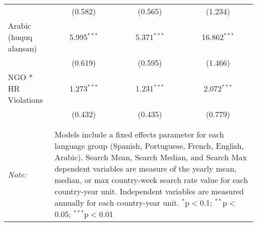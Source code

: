 \begin{table}[!htbp]
\begin{tabular}{@{\extracolsep{5pt}}lccc}
  & (0.582) & (0.565) & (1.234) \\ 
  Arabic (huquq alansan) & 5.995$^{***}$ & 5.371$^{***}$ & 16.862$^{***}$ \\ 
  & (0.619) & (0.595) & (1.466) \\ 
  NGO * HR Violations & 1.273$^{***}$ & 1.231$^{***}$ & 2.072$^{***}$ \\ 
  & (0.432) & (0.435) & (0.779) \\ 
 \hline \\[-1.8ex] 
\hline 
\hline \\[-1.8ex] 
\textit{Note:}  & \multicolumn{3}{l}{\parbox[t]{8cm}{Models include a fixed effects parameter for each language group (Spanish, Portuguese, French, English, Arabic). Search Mean, Search Median, and Search Max dependent variables are measure of the yearly mean, median, or max country-week search rate value for each country-year unit. Independent variables are measured annually for each country-year unit. $^{*}$p$<$0.1; $^{**}$p$<$0.05; $^{***}$p$<$0.01}} \\ 
\end{tabular} 
\end{table} 
